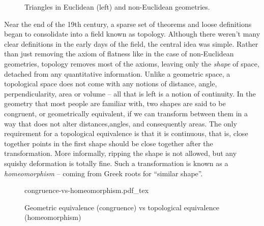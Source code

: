 \begin{figure}[ht]
	\centering
	\medskip
	\caption{Triangles in Euclidean (left) and non-Euclidean geometries.}
\end{figure}


Near the end of the 19th century, a sparse set of theorems and loose definitions began to consolidate into a field known as topology. Although there weren't many clear definitions in the early days of the field, the central idea was simple. Rather than just removing the axiom of flatness like in the case of non-Euclidean geometries, topology removes most of the axioms, leaving only the \emph{shape} of space, detached from any quantitative information. Unlike a geometric space, a topological space does not come with any notions of distance, angle, perpendicularity, area or volume -- all that is left is a notion of continuity. 
In the geometry that most people are familiar with, two shapes are said to be congruent, or geometrically equivalent, if we can transform between them in a way that does not alter distances,angles, and consequently areas. 
The only requirement for a topological equivalence is that it is continuous, that is, close together points in the first shape should be close together after the transformation. More informally, ripping the shape is not allowed, but any squishy deformation is totally fine. Such a transformation is known as a \emph{homeomorphism} -- coming from Greek roots for ``similar shape''.
\begin{figure}[ht]
	\centering
	{congruence-vs-homeomorphism.pdf_tex}
	\caption{Geometric equivalence (congruence) vs topological equivalence (homeomorphism)}
\end{figure}

